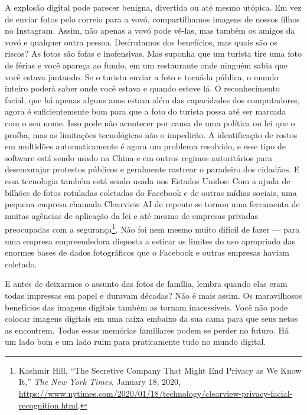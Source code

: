 A explosão digital pode parecer benigna, divertida ou até mesmo utópica. Em vez 
de enviar fotos pelo correio para a vovó, compartilhamos imagens de nossos 
filhos no Instagram. Assim, não apenas a vovó pode vê-las, mas também os amigos 
da vovó e qualquer outra pessoa. Desfrutamos dos benefícios, mas quais são os 
riscos? As fotos são fofas e inofensivas. Mas suponha que um turista tire uma 
foto de férias e você apareça ao fundo, em um restaurante onde ninguém sabia que 
você estava jantando. Se o turista enviar a foto e torná-la pública, o mundo 
inteiro poderá saber onde você estava e quando esteve lá. O reconhecimento 
facial, que há apenas alguns anos estava além das capacidades dos computadores, 
agora é suficientemente bom para que a foto do turista possa até ser marcada com 
o seu nome. Isso pode não acontecer por causa de uma política ou lei que o 
proíba, mas as limitações tecnológicas não o impedirão. A identificação de 
rostos em multidões automaticamente é agora um problema resolvido, e esse tipo 
de software está sendo usado na China e em outros regimes autoritários para 
desencorajar protestos públicos e geralmente rastrear o paradeiro dos cidadãos. 
E essa tecnologia também está sendo usada nos Estados Unidos: Com a ajuda de 
bilhões de fotos rotuladas coletadas do Facebook e de outras mídias sociais, uma 
pequena empresa chamada Clearview AI de repente se tornou uma ferramenta de 
muitas agências de aplicação da lei e até mesmo de empresas privadas preocupadas 
com a segurança\footnote{Kashmir Hill, ``The Secretive Company That Might End
Privacy as We Know It,'' \textit{The New York Times}, January 18, 2020,
\url{https://www.nytimes.com/2020/01/18/technology/clearview-privacy-facial-recognition.html}.}.
Não foi nem mesmo muito difícil de fazer --- para uma empresa empreendedora 
disposta a esticar os limites do uso apropriado das enormes bases de dados 
fotográficos que o Facebook e outras empresas haviam coletado.

E antes de deixarmos o assunto das fotos de família, lembra quando elas eram 
todas impressas em papel e duravam décadas? Não é mais assim. Os maravilhosos 
benefícios das imagens digitais também as tornam inacessíveis. Você não pode 
colocar imagens digitais em uma caixa embaixo da sua cama para que seus netos as 
encontrem. Todas essas memórias familiares podem se perder no futuro. Há um lado 
bom e um lado ruim para praticamente tudo no mundo digital.

